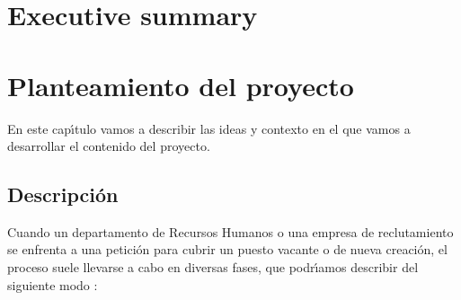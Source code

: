 \documentclass[11pt,a4paper,leqno,titlepage,twoside]{book}
\begin{document}
\chapter*{Executive summary}



\chapter{Planteamiento del proyecto}

En este cap\'\i tulo vamos a describir las ideas y contexto en el que vamos a desarrollar el contenido del proyecto.

\section{Descripci\'on}
Cuando un departamento de Recursos Humanos o una empresa de reclutamiento se enfrenta a una petici\'on para
cubrir un puesto vacante o de nueva creaci\'on, el proceso suele llevarse a cabo en diversas fases, que 
podr\'\i amos describir del siguiente modo \cite{proceso_seleccion1}:
\end{document}
